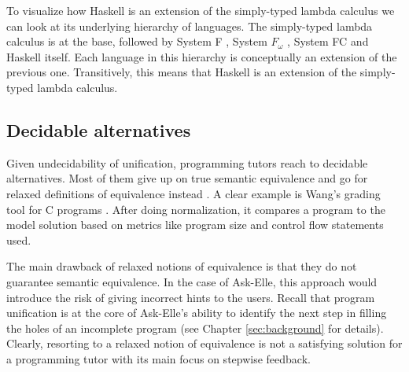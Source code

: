 To visualize how Haskell is an extension of the simply-typed lambda calculus we can look at its underlying hierarchy of languages. The simply-typed lambda calculus is at the base, followed by System F \cite{2002pierce}, System $F_\omega$ \cite{2002pierce}, System FC \cite{2007systemfc} and Haskell itself. Each language in this hierarchy is conceptually an extension of the previous one. Transitively, this means that Haskell is an extension of the simply-typed lambda calculus.



\subsection{Decidable alternatives}

Given undecidability of unification, programming tutors reach to decidable alternatives. Most of them give up on true semantic equivalence and go for relaxed definitions of equivalence instead \cite{2016feedbackreview}. A clear example is Wang's grading tool for C programs \cite{2007wang}. After doing normalization, it compares a program to the model solution based on metrics like program size and control flow statements used.

The main drawback of relaxed notions of equivalence is that they do not guarantee semantic equivalence. In the case of Ask-Elle, this approach would introduce the risk of giving incorrect hints to the users. Recall that program unification is at the core of Ask-Elle's ability to identify the next step in filling the holes of an incomplete program (see Chapter \ref{sec:background} for details). Clearly, resorting to a relaxed notion of equivalence is not a satisfying solution for a programming tutor with its main focus on stepwise feedback.

